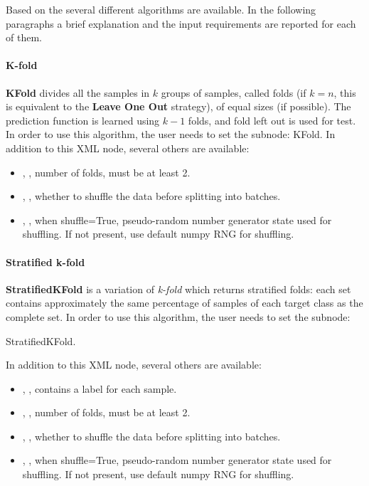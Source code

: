 Based on the  several different algorithms are available. In the following paragraphs a brief
explanation and the input requirements are reported for each of them.

\paragraph{K-fold}
\textbf{KFold} divides all the samples in $k$ groups of samples, called folds (if $k=n$, this is equivalent to the
\textbf{Leave One Out} strategy), of equal sizes (if possible). The prediction function is learned using $k-1$ folds,
and fold left out is used for test.
In order to use this algorithm, the user needs to set the subnode:
KFold.
In addition to this XML node, several others are available:
\begin{itemize}
  \item {}, , number of folds, must be at least 2. 
  \item {}, , whether to shuffle the data before splitting into
    batches.
  \item {}, , when shuffle=True,
    pseudo-random number generator state used for shuffling. If not present, use default numpy RNG for shuffling.
\end{itemize}

\paragraph{Stratified k-fold}
\textbf{StratifiedKFold} is a variation of \textit{k-fold} which returns stratified folds: each set contains approximately
the same percentage of samples of each target class as the complete set.
In order to use this algorithm, the user needs to set the subnode:

StratifiedKFold.

In addition to this XML node, several others are available:
\begin{itemize}
  \item {}, , contains a label for each sample.
  \item {}, , number of folds, must be at least 2. 
  \item {}, , whether to shuffle the data before splitting into
    batches.
  \item {}, , when shuffle=True,
    pseudo-random number generator state used for shuffling. If not present, use default numpy RNG for shuffling.
\end{itemize}

